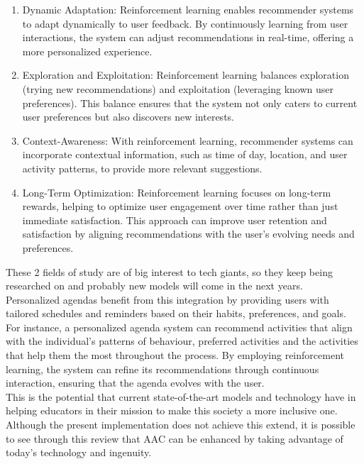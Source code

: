 \documentclass[10pt,twocolumn,letterpaper]{article}
\begin{document}
\begin{enumerate}
    
    \item Dynamic Adaptation: Reinforcement learning enables recommender systems to adapt dynamically to user feedback. By continuously learning from user interactions, the system can adjust recommendations in real-time, offering a more personalized experience.

    \item Exploration and Exploitation: Reinforcement learning balances exploration (trying new recommendations) and exploitation (leveraging known user preferences). This balance ensures that the system not only caters to current user preferences but also discovers new interests.

    \item Context-Awareness: With reinforcement learning, recommender systems can incorporate contextual information, such as time of day, location, and user activity patterns, to provide more relevant suggestions.

    \item Long-Term Optimization: Reinforcement learning focuses on long-term rewards, helping to optimize user engagement over time rather than just immediate satisfaction. This approach can improve user retention and satisfaction by aligning recommendations with the user's evolving needs and preferences.
    
\end{enumerate}

These 2 fields of study are of big interest to tech giants, so they keep being researched on and probably new models will come in the next years. \\


Personalized agendas benefit from this integration by providing users with tailored schedules and reminders based on their habits, preferences, and goals. For instance, a personalized agenda system can recommend activities that align with the individual's patterns of behaviour, preferred activities and the activities that help them the most throughout the process. By employing reinforcement learning, the system can refine its recommendations through continuous interaction, ensuring that the agenda evolves with the user.\\

This is the potential that current state-of-the-art models and technology have in helping educators in their mission to make this society a more inclusive one. Although the present implementation does not achieve this extend, it is possible to see through this review that AAC can be enhanced by taking advantage of today's technology and ingenuity.
\end{document}

